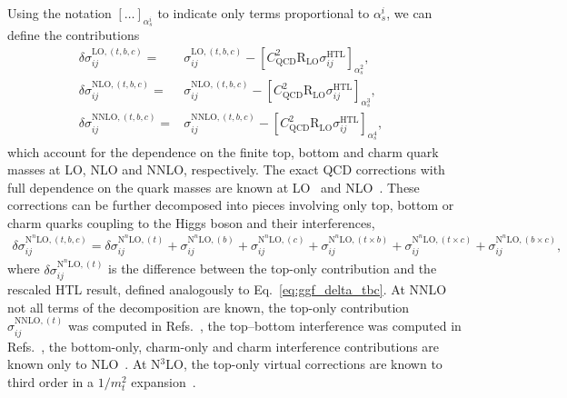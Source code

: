 Using the notation $\left[\ldots \right]_{\alpha_s^i}$ to indicate only terms proportional to $\alpha_s^i$, we can define the contributions
\begin{align}
\delta \sigma_{ij}^{\mathrm{LO}, (t,b,c)} = 
& \sigma_{ij}^{\mathrm{LO}, (t,b,c)} - \left[C_\mathrm{QCD}^2 \mathrm{R}_\mathrm{LO} \sigma_{ij}^\mathrm{HTL} \right]_{\alpha_s^2}, \\
\delta \sigma_{ij}^{\mathrm{NLO}, (t,b,c)} = &
\sigma_{ij}^{\mathrm{NLO}, (t,b,c)} - \left[C_\mathrm{QCD}^2 \mathrm{R}_\mathrm{LO} \sigma_{ij}^\mathrm{HTL} \right]_{\alpha_s^3}, \\
\delta \sigma_{ij}^{\mathrm{NNLO}, (t,b,c)} = 
& \sigma_{ij}^{\mathrm{NNLO}, (t,b,c)} - \left[C_\mathrm{QCD}^2 \mathrm{R}_\mathrm{LO} \sigma_{ij}^\mathrm{HTL} \right]_{\alpha_s^4}, \label{eq:ggf_delta_tbc} &
\end{align}
which account for the dependence on the finite top, bottom and charm quark masses at LO, NLO and NNLO, respectively.
The exact QCD corrections with full dependence on the quark masses are known at LO~\cite{Wilczek:1977zn} and NLO~\cite{Graudenz:1992pv,Spira:1995rr}.
These corrections can be further decomposed into pieces involving only top, bottom or charm quarks coupling to the Higgs boson and their interferences,
\begin{align}
\delta\sigma_{ij}^{\mathrm{N}^n\mathrm{LO}, (t,b,c)} = \delta\sigma_{ij}^{\mathrm{N}^n\mathrm{LO}, (t)} 
+ \sigma_{ij}^{\mathrm{N}^n\mathrm{LO}, (b)} 
+ \sigma_{ij}^{\mathrm{N}^n\mathrm{LO}, (c)} 
+ \sigma_{ij}^{\mathrm{N}^n\mathrm{LO}, (t \times b)}
+ \sigma_{ij}^{\mathrm{N}^n\mathrm{LO}, (t \times c)}
+ \sigma_{ij}^{\mathrm{N}^n\mathrm{LO}, (b \times c)},
\end{align}
where $\delta\sigma_{ij}^{\mathrm{N}^n\mathrm{LO},(t)} $ is the difference between the top-only contribution and the rescaled HTL result, defined analogously to Eq.~\eqref{eq:ggf_delta_tbc}.
At NNLO not all terms of the decomposition are known, the top-only contribution $\sigma_{ij}^{\mathrm{NNLO},(t)}$ was computed in Refs.~\cite{Czakon:2020vql,Czakon:2021yub,Czakon:2024ywb}, the top--bottom interference was computed in Refs.~\cite{Czakon:2023kqm,Czakon:2024ywb}, the bottom-only, charm-only and charm interference contributions are known only to NLO~\cite{Graudenz:1992pv,Spira:1995rr}.
At N$^3$LO, the top-only virtual corrections are known to third order in a $1/m_t^2$ expansion~\cite{Davies:2019wmk}.

